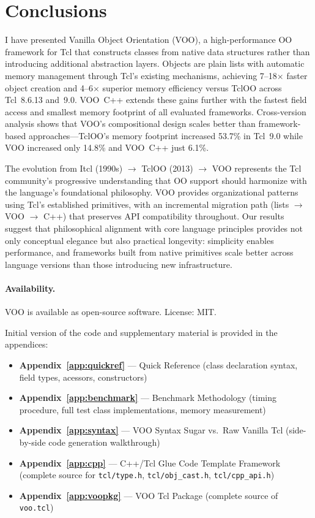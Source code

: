 \section{Conclusions}

I have presented Vanilla Object Orientation (VOO), a high-performance OO framework for
Tcl that constructs classes from native data structures rather than introducing additional
abstraction layers. Objects are plain lists with automatic memory management through
Tcl's existing mechanisms, achieving 7--18$\times$ faster object creation and
4--6$\times$ superior memory efficiency versus TclOO across Tcl~8.6.13 and~9.0.
VOO~C++ extends these gains further with the fastest field access and smallest memory
footprint of all evaluated frameworks. Cross-version analysis shows that VOO's
compositional design scales better than framework-based approaches---TclOO's memory
footprint increased 53.7\% in Tcl~9.0 while VOO increased only 14.8\% and VOO~C++ just
6.1\%.

The evolution from Itcl (1990s) $\to$ TclOO (2013) $\to$ VOO represents the Tcl
community's progressive understanding that OO support should harmonize with the
language's foundational philosophy. VOO provides organizational patterns using Tcl's
established primitives, with an incremental migration path (lists $\to$ VOO $\to$ C++)
that preserves API compatibility throughout. Our results suggest that philosophical
alignment with core language principles provides not only conceptual elegance but also
practical longevity: simplicity enables performance, and frameworks built from native
primitives scale better across language versions than those introducing new
infrastructure.

\paragraph{Availability.}
VOO is available as open-source software. License: MIT\@.

Initial version of the code and supplementary material is provided in the appendices:
\begin{sloppypar}
\begin{itemize}
  \item \textbf{Appendix~\ref{app:quickref}} --- Quick Reference (class declaration
        syntax, field types, acessors, constructors)
  \item \textbf{Appendix~\ref{app:benchmark}} --- Benchmark Methodology (timing
        procedure, full test class implementations, memory measurement)
  \item \textbf{Appendix~\ref{app:syntax}} --- VOO Syntax Sugar vs.\ Raw Vanilla Tcl
        (side-by-side code generation walkthrough)
  \item \textbf{Appendix~\ref{app:cpp}} --- C++/Tcl Glue Code Template Framework
        (complete source for \texttt{tcl/type.h}, \texttt{tcl/obj\_cast.h},
        \texttt{tcl/cpp\_api.h})
  \item \textbf{Appendix~\ref{app:voopkg}} --- VOO Tcl Package (complete source of \texttt{voo.tcl})
\end{itemize}
\end{sloppypar}
